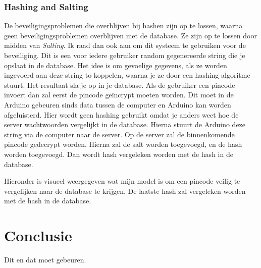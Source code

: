 \documentclass{article}
\begin{document}
\hfill

\centerline{  }

\subsubsection{Hashing and Salting}

De beveiligingsproblemen die overblijven bij hashen zijn op te lossen, waarna geen beveiligingsproblemen overblijven met de database.
Ze zijn op te lossen door midden van \emph{Salting}.
Ik raad dan ook aan om dit systeem te gebruiken voor de beveiliging.
Dit is een voor iedere gebruiker random gegenereerde string die je opslaat in de database.
Het idee is om gevoelige gegevens, als ze worden ingevoerd aan deze string to koppelen, waarna je ze door een hashing algoritme stuurt.
Het resultaat sla je op in je database.
Als de gebruiker een pincode invoert dan zal eerst de pincode ge\"incrypt moeten worden.
Dit moet in de Arduino gebeuren sinds data tussen de computer en Arduino kan worden afgeluisterd.
Hier wordt geen hashing gebruikt omdat je anders weet hoe de server wachtwoorden vergelijkt in de database.
Hierna stuurt de Arduino deze string via de computer naar de server.
Op de server zal de binnenkomende pincode gedecrypt worden.
Hierna zal de salt worden toegevoegd, en de hash worden toegevoegd.
Dan wordt hash vergeleken worden met de hash in de database.

Hieronder is visueel weergegeven wat mijn model is om een pincode veilig te vergelijken naar de database te krijgen. De laatste hash zal vergeleken worden met de hash in de database.

\hfill

\centerline{}

\newpage

\section{Conclusie}

Dit en dat moet gebeuren.
\end{document}
